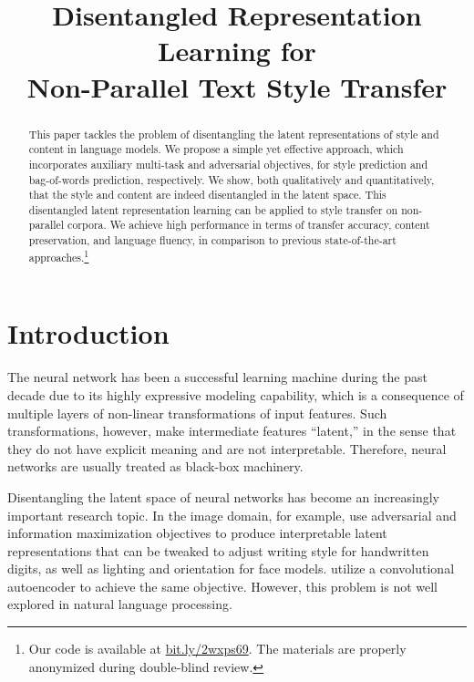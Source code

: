 \documentclass[11pt,a4paper]{article}
\title{Disentangled Representation Learning for\\Non-Parallel Text Style Transfer}
\date{}
\begin{document}
\maketitle
\graphicspath{{images/}}

\begin{abstract}
	This paper tackles the problem of disentangling the latent representations of style and content in language models. We propose a simple yet effective approach, which incorporates auxiliary multi-task and adversarial objectives, for style prediction and bag-of-words prediction, respectively. We show, both qualitatively and quantitatively, that the style and content are indeed disentangled in the latent space. This disentangled latent representation learning can be applied to style transfer on non-parallel corpora. We achieve high performance in terms of transfer accuracy, content preservation, and language fluency, in comparison to previous state-of-the-art approaches.\footnote{Our code is available at \url{bit.ly/2wxps69}. The materials are properly anonymized during double-blind review.}
\end{abstract}

% 


\section{Introduction}

The neural network has been a successful learning machine during the past decade due to its highly expressive modeling capability, which is a consequence of multiple layers of non-linear transformations of input features.
Such transformations, however, make intermediate features ``latent,'' in the sense that they do not have explicit meaning and are not interpretable.
Therefore, neural networks are usually treated as black-box machinery.

Disentangling the latent space of neural networks has become an increasingly important research topic.
In the image domain, for example, \citet{chen2016infogan} use adversarial and information maximization objectives to produce interpretable latent representations that can be tweaked to adjust writing style for handwritten digits, as well as lighting and orientation for face models.
\citet{mathieu2016disentangling} utilize a convolutional autoencoder to achieve the same objective.
However, this problem is not well explored in natural language processing.
\end{document}
